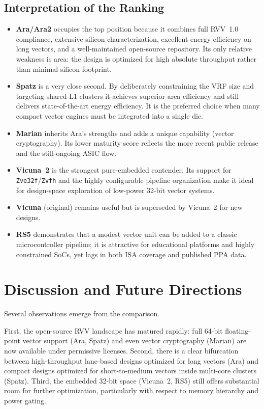 \documentclass[11pt,a4paper]{article}
\begin{document}
\subsection{Interpretation of the Ranking}

\begin{itemize}
  \item \textbf{Ara/Ara2} occupies the top position because it combines full RVV~1.0 compliance, extensive silicon characterization, excellent energy efficiency on long vectors, and a well-maintained open-source repository. Its only relative weakness is area: the design is optimized for high absolute throughput rather than minimal silicon footprint.
  \item \textbf{Spatz} is a very close second. By deliberately constraining the VRF size and targeting shared-L1 clusters it achieves superior area efficiency and still delivers state-of-the-art energy efficiency. It is the preferred choice when many compact vector engines must be integrated into a single die.
  \item \textbf{Marian} inherits Ara's strengths and adds a unique capability (vector cryptography). Its lower maturity score reflects the more recent public release and the still-ongoing ASIC flow.
  \item \textbf{Vicuna~2} is the strongest pure-embedded contender. Its support for \texttt{Zve32f}/\texttt{Zvfh} and the highly configurable pipeline organization make it ideal for design-space exploration of low-power 32-bit vector systems.
  \item \textbf{Vicuna} (original) remains useful but is superseded by Vicuna~2 for new designs.
  \item \textbf{RS5} demonstrates that a modest vector unit can be added to a classic microcontroller pipeline; it is attractive for educational platforms and highly constrained SoCs, yet lags in both ISA coverage and published PPA data.
\end{itemize}

\section{Discussion and Future Directions}

Several observations emerge from the comparison.

First, the open-source RVV landscape has matured rapidly: full 64-bit floating-point vector support (Ara, Spatz) and even vector cryptography (Marian) are now available under permissive licenses. Second, there is a clear bifurcation between high-throughput lane-based designs optimized for long vectors (Ara) and compact designs optimized for short-to-medium vectors inside multi-core clusters (Spatz). Third, the embedded 32-bit space (Vicuna~2, RS5) still offers substantial room for further optimization, particularly with respect to memory hierarchy and power gating.
\end{document}
